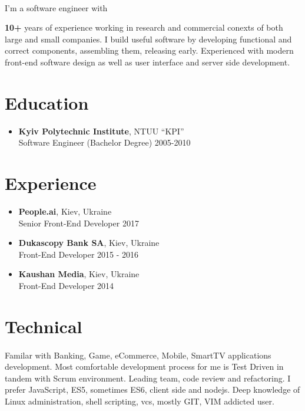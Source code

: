 \documentclass[a4paper,11pt]{article}
\begin{document}
\paragraph{}I'm a software engineer with {\textbf {\small{10+}} years of experience working in research and commercial
conexts of both large and small companies. I build useful software by developing functional and correct
components, assembling them, releasing early. Experienced with modern front-end software design as well as
user interface and server side development.

%
%

\section*{Education}
\begin{itemize}[itemsep=-4pt,label=]
  \item \textbf{Kyiv Polytechnic Institute}, NTUU ``KPI'' \\
  Software Engineer (Bachelor Degree) \hfill 2005-2010
\end{itemize}

%
%

\section*{Experience}
\begin{itemize}[itemsep=4pt,label=]

  \item \textbf{People.ai}, Kiev, Ukraine\\
    Senior Front-End Developer \hfill  2017

  \item \textbf{Dukascopy Bank SA}, Kiev, Ukraine\\
    Front-End Developer \hfill  2015 - 2016

  \item \textbf{Kaushan Media}, Kiev, Ukraine \\
    Front-End Developer \hfill  2014

\end{itemize}

%
%

\section*{Technical}
\paragraph{}Familar with Banking, Game, eCommerce, Mobile, SmartTV applications development. Most comfortable development process for me is Test Driven in tandem with Scrum environment. Leading team, code review and refactoring. I prefer JavaScript, ES5,
sometimes ES6, client side and nodejs. Deep knowledge of Linux administration, shell scripting, vcs, mostly GIT, VIM addicted user.

}
\end{document}
